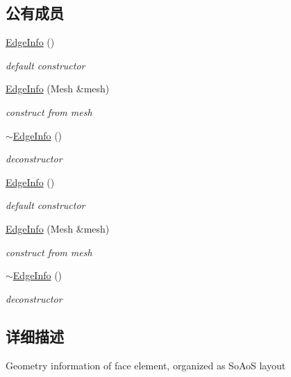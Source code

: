 \subsection*{公有成员}
\begin{DoxyCompactItemize}
\item 
\hyperlink{classEdgeInfo_ace4f72439ec4a9937fa5fb022233e1eb}{EdgeInfo} ()
\begin{DoxyCompactList}\small\item\em default constructor \item\end{DoxyCompactList}\item 
\hyperlink{classEdgeInfo_a8b2da33bbc88974d1bbbb2e9a330c819}{EdgeInfo} (Mesh \&mesh)
\begin{DoxyCompactList}\small\item\em construct from mesh \item\end{DoxyCompactList}\item 
\hyperlink{classEdgeInfo_ac1563ffa6c9641e5510503aa2e46f7a1}{$\sim$EdgeInfo} ()
\begin{DoxyCompactList}\small\item\em deconstructor \item\end{DoxyCompactList}\item 
\hyperlink{classEdgeInfo_ace4f72439ec4a9937fa5fb022233e1eb}{EdgeInfo} ()
\begin{DoxyCompactList}\small\item\em default constructor \item\end{DoxyCompactList}\item 
\hyperlink{classEdgeInfo_a8b2da33bbc88974d1bbbb2e9a330c819}{EdgeInfo} (Mesh \&mesh)
\begin{DoxyCompactList}\small\item\em construct from mesh \item\end{DoxyCompactList}\item 
\hyperlink{classEdgeInfo_ac1563ffa6c9641e5510503aa2e46f7a1}{$\sim$EdgeInfo} ()
\begin{DoxyCompactList}\small\item\em deconstructor \item\end{DoxyCompactList}\end{DoxyCompactItemize}


\subsection{详细描述}
Geometry information of face element, organized as SoAoS layout 

